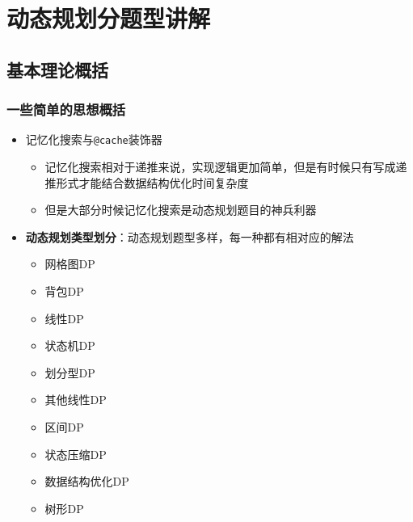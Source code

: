 

\section{动态规划分题型讲解}
\subsection{基本理论概括}

\begin{frame}[fragile]
  \frametitle{一些简单的思想概括}
  \begin{itemize}
    \item 记忆化搜索与\lstinline{@cache}装饰器

          \begin{itemize}
            \item 记忆化搜索相对于递推来说，实现逻辑更加简单，但是有时候只有写成递推形式才能结合数据结构优化时间复杂度
            \item 但是大部分时候记忆化搜索是动态规划题目的神兵利器
          \end{itemize}

    \item \textbf{动态规划类型划分}：动态规划题型多样，每一种都有相对应的解法

          \begin{itemize}
            \item 网格图\textsc{DP}
            \item 背包\textsc{DP}
            \item 线性\textsc{DP}
            \item 状态机\textsc{DP}
            \item 划分型\textsc{DP}
            \item 其他线性\textsc{DP}
            \item 区间\textsc{DP}
            \item 状态压缩\textsc{DP}
            \item 数据结构优化\textsc{DP}
            \item 树形\textsc{DP}
          \end{itemize}
  \end{itemize}
\end{frame}

